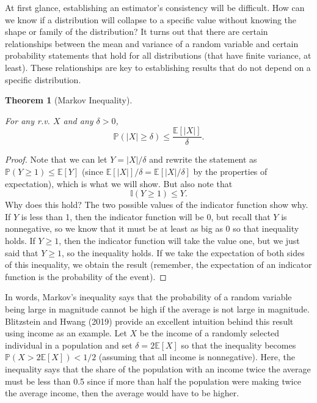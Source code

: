 \documentclass[
  letterpaper,
  DIV=11,
  numbers=noendperiod]{scrreprt}
\newcommand{\E}{\mathbb{E}}
\renewcommand{\P}{\mathbb{P}}
\theoremstyle{definition}
\theoremstyle{definition}
\theoremstyle{plain}
\newtheorem{theorem}{Theorem}[chapter]
\theoremstyle{remark}
\begin{document}
At first glance, establishing an estimator's consistency will be
difficult. How can we know if a distribution will collapse to a specific
value without knowing the shape or family of the distribution? It turns
out that there are certain relationships between the mean and variance
of a random variable and certain probability statements that hold for
all distributions (that have finite variance, at least). These
relationships are key to establishing results that do not depend on a
specific distribution.

\begin{theorem}[Markov
Inequality]\protect\hypertarget{thm-markov}{}\label{thm-markov}

For any r.v. \(X\) and any \(\delta >0\), \[
\P(|X| \geq \delta) \leq \frac{\E[|X|]}{\delta}.
\]

\end{theorem}

\begin{proof}

Note that we can let \(Y = |X|/\delta\) and rewrite the statement as
\(\P(Y \geq 1) \leq \E[Y]\) (since \(\E[|X|]/\delta = \E[|X|/\delta]\)
by the properties of expectation), which is what we will show. But also
note that \[
\mathbb{I}(Y \geq 1) \leq Y.
\] Why does this hold? The two possible values of the indicator function
show why. If \(Y\) is less than 1, then the indicator function will be
0, but recall that \(Y\) is nonnegative, so we know that it must be at
least as big as 0 so that inequality holds. If \(Y \geq 1\), then the
indicator function will take the value one, but we just said that
\(Y \geq 1\), so the inequality holds. If we take the expectation of
both sides of this inequality, we obtain the result (remember, the
expectation of an indicator function is the probability of the event).

\end{proof}

In words, Markov's inequality says that the probability of a random
variable being large in magnitude cannot be high if the average is not
large in magnitude. Blitzstein and Hwang (2019) provide an excellent
intuition behind this result using income as an example. Let \(X\) be
the income of a randomly selected individual in a population and set
\(\delta = 2\E[X]\) so that the inequality becomes
\(\P(X > 2\E[X]) < 1/2\) (assuming that all income is nonnegative).
Here, the inequality says that the share of the population with an
income twice the average must be less than 0.5 since if more than half
the population were making twice the average income, then the average
would have to be higher.
\end{document}
